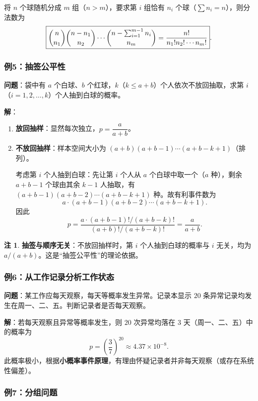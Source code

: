 \documentclass[11pt,a4paper]{report}
\theoremstyle{definition}
\newtheorem{note}{注}[chapter]
\begin{document}
将 $n$ 个球随机分成 $m$ 组（$n > m$），要求第 $i$ 组恰有 $n_i$ 个球（$\sum n_i = n$），则分法数为
\[
\boxed{\dbinom{n}{n_1}\dbinom{n-n_1}{n_2}\cdots\dbinom{n-\sum_{i=1}^{m-1}n_i}{n_m} = \frac{n!}{n_1! n_2! \cdots n_m!}}.
\]

\subsubsection{例5：抽签公平性}

\textbf{问题}：袋中有 $a$ 个白球、$b$ 个红球，$k$（$k \leq a+b$）个人依次不放回抽取，求第 $i$（$i=1,2,\dots,k$）个人抽到白球的概率。

\textbf{解}：
\begin{enumerate}[label=(\arabic*),leftmargin=2em]
    \item \textbf{放回抽样}：显然每次独立，$p = \dfrac{a}{a+b}$。
    \item \textbf{不放回抽样}：样本空间大小为 $(a+b)(a+b-1)\cdots(a+b-k+1)$（排列）。
    
    考虑第 $i$ 个人抽到白球：先让第 $i$ 个人从 $a$ 个白球中取一个（$a$ 种），剩余 $a+b-1$ 个球由其余 $k-1$ 人抽取，有 $(a+b-1)(a+b-2)\cdots(a+b-k+1)$ 种。故有利事件数为
    \[
    a \cdot (a+b-1)(a+b-2)\cdots(a+b-k+1).
    \]
    因此
    \[
    p = \frac{a \cdot (a+b-1)! / (a+b-k)!}{(a+b)! / (a+b-k)!} = \boxed{\frac{a}{a+b}}.
    \]
\end{enumerate}

\begin{note}
\textbf{抽签与顺序无关}：不放回抽样时，第 $i$ 个人抽到白球的概率与 $i$ 无关，均为 $a/(a+b)$。这是``抽签公平性''的理论依据。
\end{note}

\subsubsection{例6：从工作记录分析工作状态}

\textbf{问题}：某工作应每天观察，每天等概率发生异常。记录本显示 $20$ 条异常记录均发生在周一、二、五。判断记录者是否每天观察。

\textbf{解}：若每天观察且异常等概率发生，则 $20$ 次异常均落在 $3$ 天（周一、二、五）中的概率为
\[
p = \left(\frac{3}{7}\right)^{20} \approx 4.37 \times 10^{-8}.
\]
此概率极小，根据\textbf{小概率事件原理}，有理由怀疑记录者并非每天观察（或存在系统性偏差）。

\subsubsection{例7：分组问题}
\end{document}
